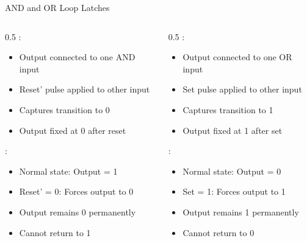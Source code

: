 \begin{frame}{AND and OR Loop Latches}
\begin{columns}
\begin{column}{0.5\textwidth}
:
\begin{itemize}
\item Output connected to one AND input
\item Reset' pulse applied to other input
\item Captures transition to 0
\item Output fixed at 0 after reset
\end{itemize}

\vspace{0.5cm}
:
\begin{itemize}
\item Normal state: Output = 1
\item Reset' = 0: Forces output to 0
\item Output remains 0 permanently
\item Cannot return to 1
\end{itemize}
\end{column}
\begin{column}{0.5\textwidth}
:
\begin{itemize}
\item Output connected to one OR input
\item Set pulse applied to other input
\item Captures transition to 1
\item Output fixed at 1 after set
\end{itemize}

\vspace{0.5cm}
:
\begin{itemize}
\item Normal state: Output = 0
\item Set = 1: Forces output to 1
\item Output remains 1 permanently
\item Cannot return to 0
\end{itemize}
\end{column}
\end{columns}
\end{frame}


